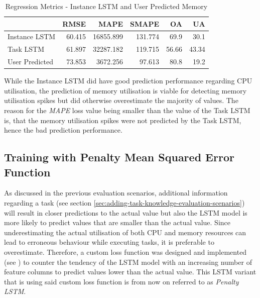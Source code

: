       \begin{table}
        \centering
        \caption{Regression Metrics - Instance LSTM and User Predicted Memory}
        \label{tab:regression-metrics-instance-lstm-user-predicted-memory}

        \begin{tabular}{|l|rrrrr|}
          \toprule
          {} &    RMSE &       MAPE &    SMAPE &    OA &    UA \\
          \midrule
          Instance LSTM   &  60.415 &  16855.899 &  131.774 &  69.9 &  30.1 \\
          Task LSTM   &  61.897 &  32287.182 &  119.715 &  56.66 &  43.34 \\
          User Predicted &  73.853 &   3672.256 &   97.613 &  80.8 &  19.2 \\
          \bottomrule
          \end{tabular}
      \end{table}
      While the Instance LSTM did have good prediction performance regarding CPU utilisation, the prediction of memory utilisation is viable for detecting memory utilisation spikes but did otherwise overestimate the majority of values.
      The reason for the \emph{MAPE} loss value being smaller than the value of the Task LSTM is, that the memory utilisation spikes were not predicted by the Task LSTM, hence the bad prediction performance.

  \subsection{Training with Penalty Mean Squared Error Function}
  \label{sec:training-with-custom-loss-function-evaluation-scenarios}

      As discussed in the previous evaluation scenarios, 
      additional information regarding a task (see section \ref{sec:adding-task-knowledge-evaluation-scenarios}) will result in closer predictions to the actual value but also the LSTM model is more likely to predict values that are smaller than the actual value.
      Since underestimating the actual utilisation of both CPU and memory resources can lead to erroneous behaviour while executing tasks, it is preferable to overestimate.
      Therefore, a custom loss function was designed and implemented (see ) to counter the tendency of the LSTM model with an increasing number of feature columns to predict values lower than the actual value.
      This LSTM variant that is using said custom loss function is from now on referred to as \emph{Penalty LSTM}.

